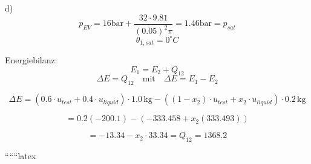 d)
\[
p_{EV} = 16 \text{bar} + \frac{32 \cdot 9.81}{(0.05)^2 \pi} = 1.46 \text{bar} = p_{sat}
\]
\[
\theta_{1,sat} = 0^\circ C
\]

Energiebilanz:
\[
E_1 = E_2 + Q_{12}
\]
\[
\Delta E = Q_{12} \quad \text{mit} \quad \Delta E = E_1 - E_2
\]

\[
\Delta E = (0.6 \cdot u_{test} + 0.4 \cdot u_{liquid}) \cdot 1.0 \, \text{kg} - \left( (1 - x_2) \cdot u_{test} + x_2 \cdot u_{liquid} \right) \cdot 0.2 \, \text{kg}
\]

\[
= 0.2 \left( -200.1 \right) - \left( -333.458 + x_2 (333.493) \right)
\]

\[
= -13.34 - x_2 \cdot 33.34 = Q_{12} = 1368.2
\]

``````latex